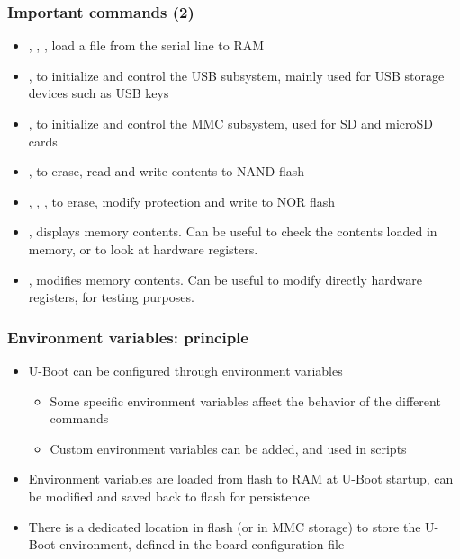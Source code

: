 \begin{frame}
  \frametitle{Important commands (2)}
  \begin{itemize}
  \item {}, , , load a file from the
    serial line to RAM
  \item {}, to initialize and control the USB subsystem,
    mainly used for USB storage devices such as USB keys
  \item {}, to initialize and control the MMC subsystem, used
    for SD and microSD cards
  \item {}, to erase, read and write contents to NAND flash
  \item {}, , , to erase, modify
    protection and write to NOR flash
  \item {}, displays memory contents. Can be useful to check the
    contents loaded in memory, or to look at hardware registers.
  \item {}, modifies memory contents. Can be useful to modify
    directly hardware registers, for testing purposes.
\end{itemize}
\end{frame}

\begin{frame}
  \frametitle{Environment variables: principle}
  \begin{itemize}
  \item U-Boot can be configured through environment variables
    \begin{itemize}
    \item Some specific environment variables affect the behavior of
      the different commands
    \item Custom environment variables can be added, and used in
      scripts
    \end{itemize}
  \item Environment variables are loaded from flash to RAM at U-Boot
    startup, can be modified and saved back to flash for persistence
  \item There is a dedicated location in flash (or in MMC storage)
    to store the U-Boot environment, defined in the board configuration file
  \end{itemize}
\end{frame}

